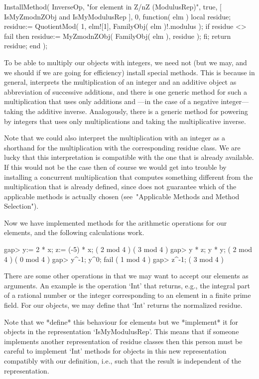 InstallMethod( InverseOp,
    "for element in Z/nZ (ModulusRep)",
    true,
    [ IsMyZmodnZObj and IsMyModulusRep ], 0,
    function( elm )
    local residue;
    residue:= QuotientMod( 1, elm![1], FamilyObj( elm )!.modulus );
    if residue <> fail then
      residue:= MyZmodnZObj( FamilyObj( elm ), residue );
    fi;
    return residue;
    end );
\endtt

To be able to multiply our objects with integers,
we need not (but we may, and we should if we are going for efficiency)
install special methods.
This is because in general, {\GAP} interprets the multiplication
of an integer and an additive object as abbreviation of successive
additions, and there is one generic method for such a multiplication
that uses only additions and ---in the case of a negative integer---
taking the additive inverse.
Analogously, there is a generic method for powering by integers
that uses only multiplications and taking the multiplicative inverse.

Note that we could also interpret the multiplication with an integer
as a shorthand for the multiplication with the corresponding residue
class.
We are lucky that this interpretation is compatible with the one that
is already available.
If this would not be the case then of course we would get into trouble
by installing a concurrent multiplication that computes something
different from the multiplication that is already defined,
since {\GAP} does not guarantee which of the applicable methods is
actually chosen (see~"Applicable Methods and Method Selection").

Now we have implemented methods for the arithmetic operations for our
elements, and the following calculations work.

\begintt
gap> y:= 2 * x;  z:= (-5) * x;
( 2 mod 4 )
( 3 mod 4 )
gap> y * z;  y * y;
( 2 mod 4 )
( 0 mod 4 )
gap> y^-1;  y^0;
fail
( 1 mod 4 )
gap> z^-1;
( 3 mod 4 )
\endtt

There are some other operations in {\GAP} that we may want to accept
our elements as arguments.
An example is the operation `Int' that returns, e.g.,
the integral part of a rational number or the integer corresponding to
an element in a finite prime field.
For our objects, we may define that `Int' returns the normalized residue.

Note that we *define* this behaviour for elements
but we *implement* it for objects in the representation `IsMyModulusRep'.
This means that if someone implements another representation of
residue classes then this person must be careful to implement `Int'
methods for objects in this new representation compatibly with our
definition, i.e., such that the result is independent of the representation.

